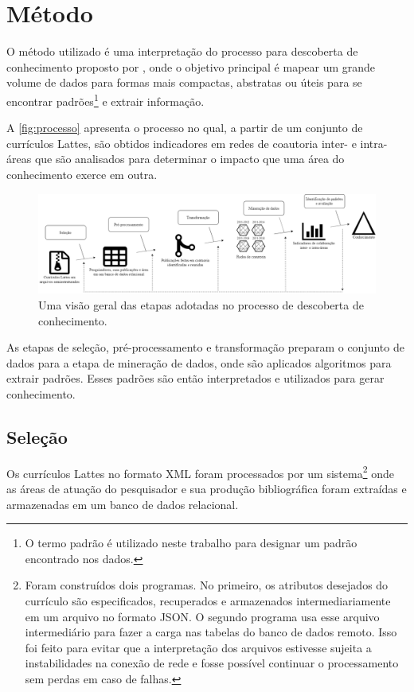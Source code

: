 \chapter[Método]{Método}

O método utilizado é uma interpretação do processo para descoberta de conhecimento proposto por , onde o objetivo principal é mapear um grande volume de dados para formas mais compactas, abstratas ou úteis para se encontrar padrões\footnote{O termo padrão é utilizado neste trabalho para designar um padrão encontrado nos dados.} e extrair informação.

A \autoref{fig:processo} apresenta o processo no qual, a partir de um conjunto de currículos Lattes, são obtidos indicadores em redes de coautoria inter- e intra-áreas que são analisados para determinar o impacto que uma área do conhecimento exerce em outra.

\begin{figure}[htpb]
  \centering
  \includegraphics[width=1\textwidth]{figuras/metodo-diagrama-fayyad}
  \caption{Uma visão geral das etapas adotadas no processo de descoberta de conhecimento.}
  \label{fig:processo}
\end{figure}

As etapas de seleção, pré-processamento e transformação preparam o conjunto de dados para a etapa de mineração de dados, onde são aplicados algoritmos para extrair padrões. Esses padrões são então interpretados e utilizados para gerar conhecimento.

\section{Seleção}

Os currículos Lattes no formato XML foram processados por um sistema\footnote{Foram construídos dois programas. No primeiro, os atributos desejados do currículo são especificados, recuperados e armazenados intermediariamente em um arquivo no formato JSON. O segundo programa usa esse arquivo intermediário para fazer a carga nas tabelas do banco de dados remoto. Isso foi feito para evitar que a interpretação dos arquivos estivesse sujeita a instabilidades na conexão de rede e fosse possível continuar o processamento sem perdas em caso de falhas.} onde as áreas de atuação do pesquisador e sua produção bibliográfica foram extraídas e armazenadas em um banco de dados relacional.

